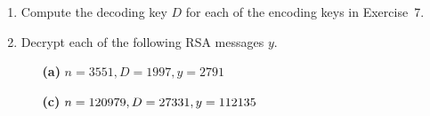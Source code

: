 {\begin{enumerate}
\begin{minipage}[t]{4.6in}
\begin{minipage}[t]{2.25in}
\begin{itemize}
 \item[{\bf (a)}]
$n = 3551, E = 629, x = 31$
 
 \item[{\bf (c)}]
$n = 120979, E = 13251,\\ x = 142371$
 
\end{itemize}
\end{minipage} \hfill
\begin{minipage}[t]{2.25in}
\begin{itemize}
 
 \item[{\bf (b)}]
$n = 2257, E = 47, x = 23$
 
 \item[{\bf (d)}]
$n = 45629, E = 781,\\ x = 231561$
 
\end{itemize}
\end{minipage}
\end{minipage}
 
\vspace{2pt}        %
 
 
 
\bf\item\rm
Compute the decoding key $D$ for each of the encoding keys in
Exercise~7. 
 
 
\bf\item\rm
Decrypt each of the following RSA messages $y$.
 
 
\vspace{3pt}        %
 
\hspace{-7pt}
\begin{minipage}[t]{4.6in}
\noindent
\begin{minipage}[t]{2.25in}
\begin{itemize}
 
 \item[{\bf (a)}]
$n = 3551, D = 1997, y = 2791$
 
 \item[{\bf (c)}]
$n = 120979, D = 27331,\\ y = 112135$
 
\end{itemize}
\end{minipage} \hfill
\begin{minipage}[t]{2.25in}
\begin{itemize}
 

\end{itemize}
\end{minipage}
\end{minipage}
\end{enumerate}}
